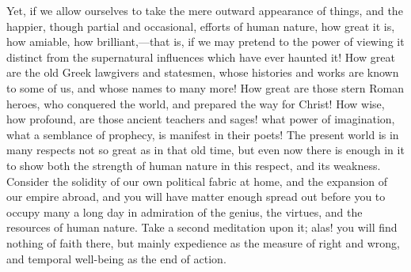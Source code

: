 Yet, if we allow ourselves to take the mere outward appearance of
things, and the happier, though partial and occasional, efforts of
human nature, how great it is, how amiable, how brilliant,—that is,
if we may pretend to the power of viewing it distinct from the
supernatural influences which have ever haunted it! How great are the
old Greek lawgivers and statesmen, whose histories and works are known
to some of us, and whose names to many more! How great are those stern
Roman heroes, who conquered the world, and prepared the way for
Christ! How wise, how profound, are those ancient teachers and sages!
what power of imagination, what a semblance of prophecy, is manifest
in their poets! The present world is in many respects not so great as
in that old time, but even now there is enough in it to show both the
strength of human nature in this respect, and its weakness. Consider
the solidity of our own political fabric at home, and the expansion of
our empire abroad, and you will have matter enough spread out before
you to occupy many a long day in admiration of the genius, the
virtues, and the resources of human nature. Take a second meditation
upon it; alas! you will find nothing of faith there, but mainly
expedience as the measure of right and wrong, and temporal well-being
as the end of action.

